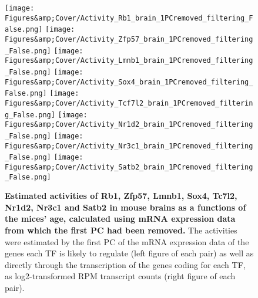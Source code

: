 \begin{figure}
    \centering
    \texttt{[image: Figures\&amp;Cover/Activity\_Rb1\_brain\_1PCremoved\_filtering\_False.png]}
    \hspace{0.25cm}
    \vspace{0.25cm}
    \texttt{[image: Figures\&amp;Cover/Activity\_Zfp57\_brain\_1PCremoved\_filtering\_False.png]}
    \vspace{0.25cm}
    \texttt{[image: Figures\&amp;Cover/Activity\_Lmnb1\_brain\_1PCremoved\_filtering\_False.png]}
    \hspace{0.25cm}
    \texttt{[image: Figures\&amp;Cover/Activity\_Sox4\_brain\_1PCremoved\_filtering\_False.png]}
    \vspace{0.25cm}
    \texttt{[image: Figures\&amp;Cover/Activity\_Tcf7l2\_brain\_1PCremoved\_filtering\_False.png]}
    \hspace{0.25cm}
    \texttt{[image: Figures\&amp;Cover/Activity\_Nr1d2\_brain\_1PCremoved\_filtering\_False.png]}
    \vspace{0.25cm}
    \texttt{[image: Figures\&amp;Cover/Activity\_Nr3c1\_brain\_1PCremoved\_filtering\_False.png]}
    \hspace{0.25cm}
    \texttt{[image: Figures\&amp;Cover/Activity\_Satb2\_brain\_1PCremoved\_filtering\_False.png]}
    \caption{\textbf{Estimated activities of Rb1, Zfp57, Lmnb1, Sox4, Tc7l2, Nr1d2, Nr3c1 and Satb2 in mouse brains as a functions of the mices' age, calculated using mRNA expression data from which the first \ac{PC} had been removed.} The activities were estimated by the first \ac{PC} of the mRNA expression data of the genes each \ac{TF} is likely to regulate (left figure of each pair) as well as directly through the transcription of the genes coding for each \ac{TF}, as log2-transformed \ac{RPM} transcript counts (right figure of each pair).}
    \label{fig:BrainEstsClean2}
\end{figure}

